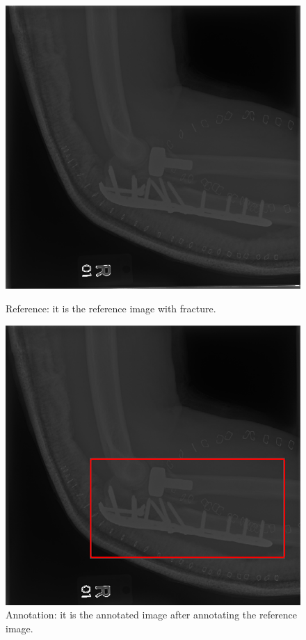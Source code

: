 \documentclass[12pt,oneside,a4paper]{article}
\begin{document}
\begin{figure}[htbp] %
\begin{minipage}[t]{0.5\textwidth}%
\centering
\includegraphics[width=\textwidth]{images/reference.png}
 \caption{Reference: it is the reference image with fracture.}
\end{minipage}
\begin{minipage}[t]{0.5\textwidth}
\centering
\includegraphics[width=\textwidth]{images/Annotation.png}
 \caption{Annotation: it is the annotated image after annotating the reference image.}
\end{minipage}
\end{figure}
\end{document}
